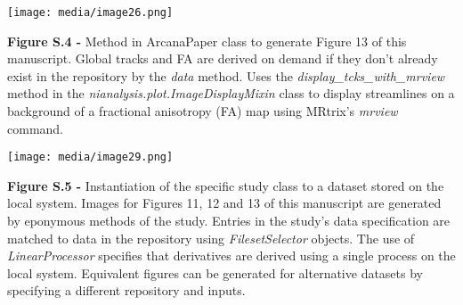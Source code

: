 \texttt{[image: media/image26.png]}

\textbf{Figure S.4 -} Method in ArcanaPaper class to generate Figure 13
of this manuscript. Global tracks and FA are derived on demand if they
don't already exist in the repository by the \emph{data} method. Uses
the \emph{display\_tcks\_with\_mrview} method in the
\emph{nianalysis.plot.ImageDisplayMixin} class to display streamlines on
a background of a fractional anisotropy (FA) map using MRtrix's
\emph{mrview} command.

\texttt{[image: media/image29.png]}

\textbf{Figure S.5 -} Instantiation of the specific study class to a
dataset stored on the local system. Images for Figures 11, 12 and 13 of
this manuscript are generated by eponymous methods of the study. Entries
in the study's data specification are matched to data in the repository
using \emph{FilesetSelector} objects. The use of \emph{LinearProcessor}
specifies that derivatives are derived using a single process on the
local system. Equivalent figures can be generated for alternative
datasets by specifying a different repository and inputs.
